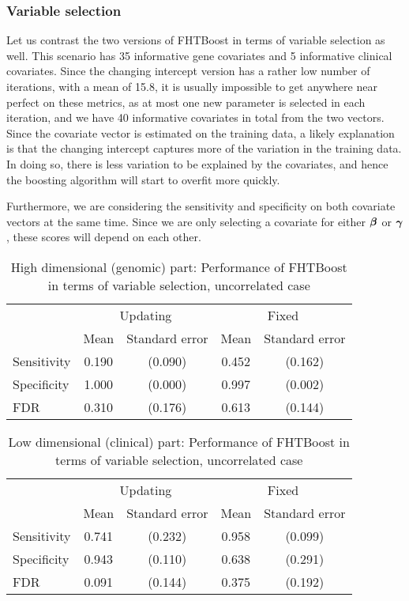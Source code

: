 \subsubsection{Variable selection}
Let us contrast the two versions of FHTBoost in terms of variable selection as well.
This scenario has 35 informative gene covariates and 5 informative clinical covariates.
Since the changing intercept version has a rather low number of iterations, with a mean of 15.8, it is usually impossible to get anywhere near perfect on these metrics, as at most one new parameter is selected in each iteration, and we have 40 informative covariates in total from the two vectors.
Since the covariate vector is estimated on the training data, a likely explanation is that the changing intercept captures more of the variation in the training data.
In doing so, there is less variation to be explained by the covariates, and hence the boosting algorithm will start to overfit more quickly.

Furthermore, we are considering the sensitivity and specificity on both covariate vectors at the same time.
Since we are only selecting a covariate for either $\boldsymbol{\beta}$ or $\boldsymbol{\gamma}$, these scores will depend on each other.

\begin{table}
\caption{High dimensional (genomic) part: Performance of FHTBoost in terms of variable selection, uncorrelated case}
\label{table:uncorrelated-y0}
\centering
\begin{tabular}{l|cc|cc}
\toprule
& \multicolumn{2}{c}{Updating} & \multicolumn{2}{c}{Fixed} \\
& Mean & Standard error & Mean & Standard error \\
\hline
Sensitivity & 0.190 & (0.090) & 0.452 & (0.162) \\
Specificity & 1.000 & (0.000) & 0.997 & (0.002) \\
FDR         & 0.310 & (0.176) & 0.613 & (0.144) \\
\bottomrule
\end{tabular}
\end{table}

\begin{table}
\caption{Low dimensional (clinical) part: Performance of FHTBoost in terms of variable selection, uncorrelated case}
\label{table:uncorrelated-mu}
\centering
\begin{tabular}{l|cc|cc}
\toprule
& \multicolumn{2}{c}{Updating} & \multicolumn{2}{c}{Fixed} \\
& Mean & Standard error & Mean & Standard error \\
\hline
Sensitivity & 0.741 & (0.232) & 0.958 & (0.099) \\
Specificity & 0.943 & (0.110) & 0.638 & (0.291) \\
FDR         & 0.091 & (0.144) & 0.375 & (0.192) \\
\bottomrule
\end{tabular}
\end{table}

